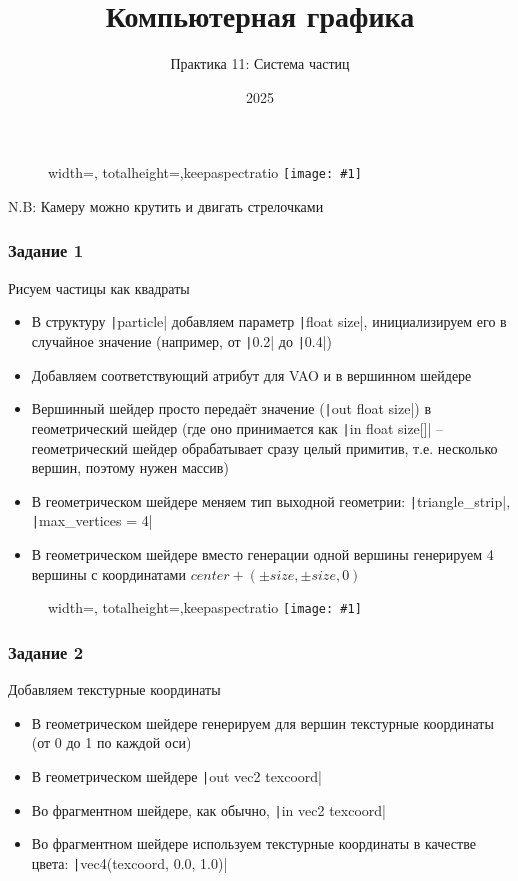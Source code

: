 \documentclass[10pt]{beamer}
\title{Компьютерная графика}
\subtitle{Практика 11: Система частиц}
\date{2025}
\newcommand{\slideimage}[1]{
  \begin{figure}
    \begin{adjustbox}{width=\textwidth, totalheight=\textheight-2\baselineskip-2\baselineskip,keepaspectratio}
      \texttt{[image: \#1]}
    \end{adjustbox}
  \end{figure}
}
\begin{document}
\frame{\titlepage}

\begin{frame}[fragile]
\slideimage{0.png}
\end{frame}

\begin{frame}[fragile]
N.B: Камеру можно крутить и двигать стрелочками
\end{frame}

\begin{frame}[fragile]
\frametitle{Задание 1}
Рисуем частицы как квадраты
\begin{itemize}
\item В структуру \texttt|particle| добавляем параметр \texttt|float size|, инициализируем его в случайное значение (например, от \texttt|0.2| до \texttt|0.4|)
\item Добавляем соответствующий атрибут для VAO и в вершинном шейдере
\item Вершинный шейдер просто передаёт значение (\texttt|out float size|) в геометрический шейдер (где оно принимается как \texttt|in float size[]| -- геометрический шейдер обрабатывает сразу целый примитив, т.е. несколько вершин, поэтому нужен массив)
\item В геометрическом шейдере меняем тип выходной геометрии: \texttt|triangle_strip|, \texttt|max_vertices = 4|
\item В геометрическом шейдере вместо генерации одной вершины генерируем 4 вершины с координатами \begin{math}center + (\pm size, \pm size, 0)\end{math}
\end{itemize}
\end{frame}

\begin{frame}[fragile]
\slideimage{1.png}
\end{frame}

\begin{frame}[fragile]
\frametitle{Задание 2}
Добавляем текстурные координаты
\begin{itemize}
\item В геометрическом шейдере генерируем для вершин текстурные координаты (от 0 до 1 по каждой оси)
\item В геометрическом шейдере \texttt|out vec2 texcoord|
\item Во фрагментном шейдере, как обычно, \texttt|in vec2 texcoord|
\item Во фрагментном шейдере используем текстурные координаты в качестве цвета: \texttt|vec4(texcoord, 0.0, 1.0)|
\end{itemize}
\end{frame}
\end{document}

